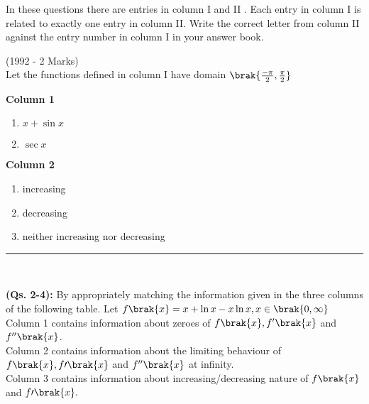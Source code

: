 
\iffalse
\title{JEE ADVANCED Assignment 1}
\author{Homa Harshitha Vuddanti(EE24BTECH11062)}
\section{matrix-match} 
\fi

\item In these questions there are entries in column I and II . Each entry in column I is related to exactly one entry in column II. Write the correct letter from column II against the entry number in column I in your answer book.

\hfill{(1992 - 2 Marks)}\\
Let the functions defined in column I have domain $\brak{\frac{-\pi}{2},\frac{\pi}{2}}$\\
\begin{minipage}[t]{0.32\textwidth}
 \textbf{Column 1}\\
 \begin{enumerate}[label=(\Alph*)]
     \item $x+ \sin x$
     \item $\sec x$
 \end{enumerate}
     \end{minipage}
     \hfill
\begin{minipage}[t]{0.32\textwidth}
    \textbf{Column 2}\\
    \begin{enumerate}[label=(\alph*), start=16]
    \item increasing
    \item decreasing
    \item neither increasing nor decreasing
\end{enumerate}
\end{minipage}
\hrule\


\item \textbf{(Qs. 2-4):} 
By appropriately matching the information given in the three columns of the following table.
Let $f\brak{x} = x+\ln x-x\ln x, x\in\brak{0,\infty}$\\
Column 1 contains information about zeroes of $f\brak{x}, f^{\prime}\brak{x}$ and $f^{\prime\prime}\brak{x}$.\\
Column 2 contains information about the limiting behaviour of $f\brak{x}, f{\prime}\brak{x}$ and $f^{\prime\prime}\brak{x}$ at infinity.\\
Column 3 contains information about increasing/decreasing nature of $f\brak{x}$ and $f{\prime}\brak{x}.$\\


